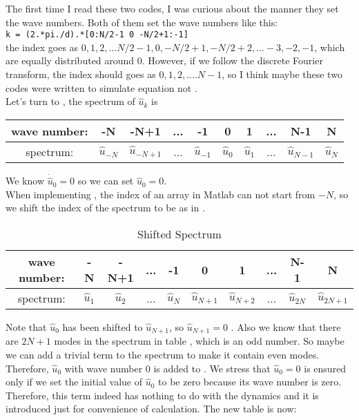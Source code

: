 \begin{description}
The first time I read these two codes, I was curious about the manner they set the wave numbers. Both of them
set the wave numbers like this: \\
\texttt{k = (2.*pi./d).*[0:N/2-1 0 -N/2+1:-1]}\\
the index goes as $0,1,2,...N/2-1, 0, -N/2+1,-N/2+2,...-3,-2,-1$, which are equally distributed around $0$.
However, if we follow the discrete Fourier transform, the index should goes as $0,1,2,....N-1$, so I think maybe
these two codes were written to simulate equation  not .
\\

Let's turn to , the spectrum of $\hat{u}_{k}$ is \\

\begin{tabular}{c || c | c | c | c | c | c | c | c | c }
\hline
 wave number: & -N & -N+1 & ... & -1 & 0 & 1 & ... & N-1  & N \\ \hline
 spectrum:    & $\hat{u}_{-N}$ & $\hat{u}_{-N+1}$ & ... & $\hat{u}_{-1}$
 & $\hat{u}_{0}$ & $\hat{u}_{1}$ & ... & $\hat{u}_{N-1}$ & $\hat{u}_{N}$ \\
\hline
 \end{tabular}

 We know $\dot{\hat{u}}_{0}=0$ so we can set
 $\hat{u}_{0}=0$.\\

 When implementing , the index of an array in Matlab can not start from $-N$,
 so we shift the index of the spectrum to be as in .
%
 \begin{table}[H]
 \centering
\begin{tabular}{c || c | c | c | c | c | c | c | c | c }
\hline
 wave number: & -N & -N+1 & ... & -1 & 0 & 1 & ... & N-1  & N \\ \hline
 spectrum:    & $\hat{u}_{1}$ & $\hat{u}_{2}$ & ... & $\hat{u}_{N}$ &
 $\hat{u}_{N+1}$ & $\hat{u}_{N+2}$ & ... & $\hat{u}_{2N}$ & $\hat{u}_{2N+1}$ \\
\hline
 \end{tabular}
 \caption{Shifted Spectrum}
 \label{xtab1}
 \end{table}
%
 Note that $\hat{u}_{0}$ has been shifted to $\hat{u}_{N+1}$, so $\hat{u}_{N+1}=0$ .
 Also we know that there are $2N+1$
 modes in the spectrum in table , which is an odd number. So maybe we can add a trivial
 term to the spectrum to make it contain even modes. Therefore, $\hat{u}_{0}$ with wave number $0$
 is added to . We stress that $\hat{u}_{0}=0$ is ensured only if we set the initial
 value of $\hat{u}_{0}$ to be zero because its wave number is zero. Therefore, this term indeed has
 nothing to do with the dynamics and it is introduced just for convenience of calculation.
 The new table is now:\\


\end{description}
